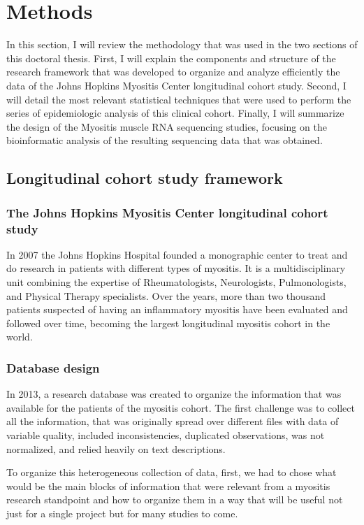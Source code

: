 \chapter{Methods}
In this section, I will review the methodology that was used in the two sections of this doctoral thesis. First, I will explain the components and structure of the research framework that was developed to organize and analyze efficiently the data of the Johns Hopkins Myositis Center longitudinal cohort study. Second, I will detail the most relevant statistical techniques that were used to perform the series of epidemiologic analysis of this clinical cohort. Finally, I will summarize the design of the Myositis muscle RNA sequencing studies, focusing on the bioinformatic analysis of the resulting sequencing data that was obtained.

\section{Longitudinal cohort study framework}

\subsection{The Johns Hopkins Myositis Center longitudinal cohort study}
In 2007 the Johns Hopkins Hospital founded a monographic center to treat and do research in patients with different types of myositis. It is a multidisciplinary unit combining the expertise of Rheumatologists, Neurologists, Pulmonologists, and Physical Therapy specialists. Over the years, more than two thousand patients suspected of having an inflammatory myositis have been evaluated and followed over time, becoming the largest longitudinal myositis cohort in the world.

\subsection{Database design}

In 2013, a research database was created to organize the information that was available for the patients of the myositis cohort. The first challenge was to collect all the information, that was originally spread over different files with data of variable quality, included inconsistencies, duplicated observations, was not normalized, and relied heavily on text descriptions.

To organize this heterogeneous collection of data, first, we had to chose what would be the main blocks of information that were relevant from a myositis research standpoint and how to organize them in a way that will be useful not just for a single project but for many studies to come.

